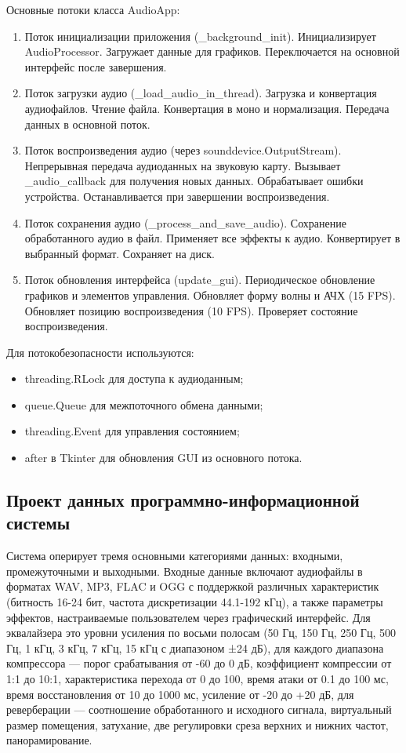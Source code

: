 Основные потоки класса AudioApp:
\begin{enumerate}
	\item Поток инициализации приложения (\_background\_init). Инициализирует AudioProcessor. Загружает данные для графиков. Переключается на основной интерфейс после завершения.
	\item Поток загрузки аудио (\_load\_audio\_in\_thread). Загрузка и конвертация аудиофайлов. Чтение файла. Конвертация в моно и нормализация. Передача данных в основной поток.
	\item Поток воспроизведения аудио (через sounddevice.OutputStream). Непрерывная передача аудиоданных на звуковую карту. Вызывает \_audio\_callback для получения новых данных. Обрабатывает ошибки устройства. Останавливается при завершении воспроизведения.
	\item Поток сохранения аудио (\_process\_and\_save\_audio). Сохранение обработанного аудио в файл. Применяет все эффекты к аудио. Конвертирует в выбранный формат. Сохраняет на диск.
	\item Поток обновления интерфейса (update\_gui). Периодическое обновление графиков и элементов управления. Обновляет форму волны и АЧХ (15 FPS). Обновляет позицию воспроизведения (10 FPS). Проверяет состояние воспроизведения.
\end{enumerate}

Для потокобезопасности используются:
\begin{itemize}
	\item threading.RLock для доступа к аудиоданным;
	\item queue.Queue для межпоточного обмена данными;
	\item threading.Event для управления состоянием;
	\item after в Tkinter для обновления GUI из основного потока.
\end{itemize}

\subsection{Проект данных программно-информационной системы}

Система оперирует тремя основными категориями данных: входными, промежуточными и выходными. Входные данные включают аудиофайлы в форматах WAV, MP3, FLAC и OGG с поддержкой различных характеристик (битность 16-24 бит, частота дискретизации 44.1-192 кГц), а также параметры эффектов, настраиваемые пользователем через графический интерфейс. Для эквалайзера это уровни усиления по восьми полосам (50 Гц, 150 Гц, 250 Гц, 500 Гц, 1 кГц, 3 кГц, 7 кГц, 15 кГц с диапазоном ±24 дБ), для каждого диапазона компрессора — порог срабатывания от -60 до 0 дБ, коэффициент компрессии от 1:1 до 10:1, характеристика перехода от 0 до 100, время атаки от 0.1 до 100 мс, время восстановления от 10 до 1000 мс, усиление от -20 до +20 дБ, для реверберации — соотношение обработанного и исходного сигнала, виртуальный размер помещения, затухание, две регулировки среза верхних и нижних частот, панорамирование.

